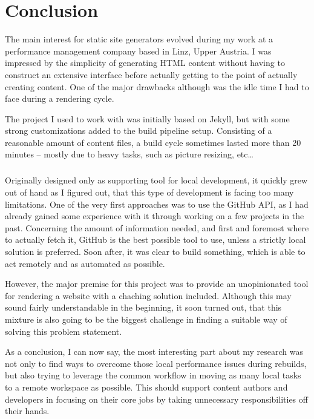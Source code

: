 \chapter{Conclusion}
\label{cha:conclusion}

The main interest for static site generators evolved during my work at a performance management company based in Linz, Upper Austria. I was impressed by the simplicity of generating HTML content without having to construct an extensive interface before actually getting to the point of actually creating content. One of the major drawbacks although was the idle time I had to face during a rendering cycle.

The project I used to work with was initially based on Jekyll, but with some strong customizations added to the build pipeline setup. Consisting of a reasonable amount of content files, a build cycle sometimes lasted more than 20 minutes -- mostly due to heavy tasks, such as picture resizing, etc\ldots

\paragraph{}
Originally designed only as supporting tool for local development, it quickly grew out of hand as I figured out, that this type of development is facing too many limitations. One of the very first approaches was to use the GitHub API, as I had already gained some experience with it through working on a few projects in the past. Concerning the amount of information needed, and first and foremost where to actually fetch it, GitHub is the best possible tool to use, unless a strictly local solution is preferred. Soon after, it was clear to build something, which is able to act remotely and as automated as possible.

However, the major premise for this project was to provide an unopinionated tool for rendering a website with a chaching solution included. Although this may sound fairly understandable in the beginning, it soon turned out, that this mixture is also going to be the biggest challenge in finding a suitable way of solving this problem statement.

As a conclusion, I can now say, the most interesting part about my research was not only to find ways to overcome those local performance issues during rebuilds, but also trying to leverage the common workflow in moving as many local tasks to a remote workspace as possible. This should support content authors and developers in focusing on their core jobs by taking unnecessary responsibilities off their hands.


